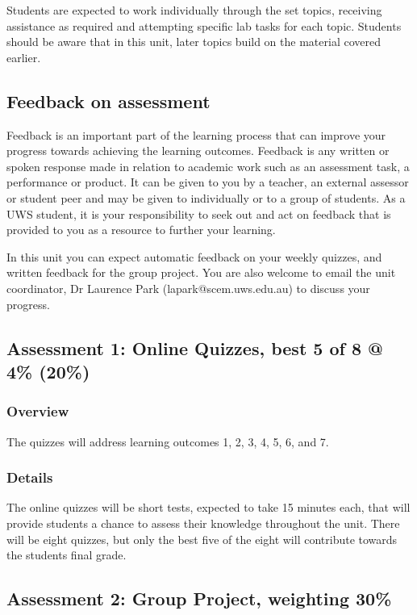 \documentclass{uws_learning_guide}
\begin{document}
Students are expected to work individually through the set topics,
receiving assistance as required and attempting specific lab
tasks for each topic. Students should be aware that in this unit,
later topics build on the material covered earlier.



\subsection{\hintlogo{}  Feedback on assessment}

Feedback is an important part of the learning process that can improve
your progress towards achieving the learning outcomes.  Feedback is
any written or spoken response made in relation to academic work such
as an assessment task, a performance or product.  It can be given to
you by a teacher, an external assessor or student peer and may be
given to individually or to a group of students.  As a UWS student, it
is your responsibility to seek out and act on feedback that is
provided to you as a resource to further your learning.

In this unit you can expect automatic feedback on your weekly quizzes,
and written feedback for the group project.
You are also
welcome to email the unit coordinator, Dr Laurence Park
(lapark@scem.uws.edu.au) to discuss your progress.

\subsection{Assessment 1: Online Quizzes, best 5 of 8 @ 4\% (20\%)}

\subsubsection{Overview}

The quizzes will address learning outcomes 1, 2, 3, 4, 5, 6, and 7.

\subsubsection{Details}

The online quizzes will be short tests, expected to take 15 minutes
each, that will provide students a chance to assess their knowledge
throughout the unit.  There will be eight quizzes, but only the best
five of the eight will contribute towards the students final grade.


\subsection{Assessment 2: Group Project, weighting 30\%}
\end{document}
